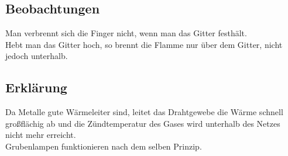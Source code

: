 \subsection{Beobachtungen}

Man verbrennt sich die Finger nicht, wenn man das Gitter festhält.\\
Hebt man das Gitter hoch, so brennt die Flamme nur über dem Gitter, nicht jedoch unterhalb.

\subsection{Erklärung}

Da Metalle gute Wärmeleiter sind, leitet das Drahtgewebe die Wärme schnell großflächig ab und die Zündtemperatur des Gases wird unterhalb des Netzes nicht mehr erreicht.\\
Grubenlampen funktionieren nach dem selben Prinzip.

